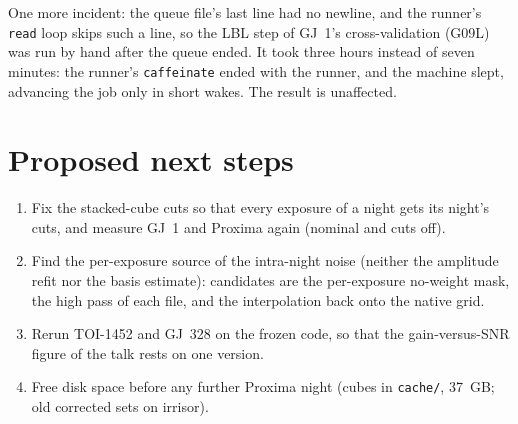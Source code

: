 \noindent One more incident: the queue file's last line had no newline, and
the runner's \texttt{read} loop skips such a line, so the LBL step of GJ~1's
cross-validation (G09L) was run by hand after the queue ended. It took three
hours instead of seven minutes: the runner's \texttt{caffeinate} ended with
the runner, and the machine slept, advancing the job only in short wakes. The
result is unaffected.

\section*{Proposed next steps}

\begin{enumerate}
\item Fix the stacked-cube cuts so that every exposure of a night gets its
  night's cuts, and measure GJ~1 and Proxima again (nominal and cuts off).
\item Find the per-exposure source of the intra-night noise (neither the
  amplitude refit nor the basis estimate): candidates are the per-exposure
  no-weight mask, the high pass of each file, and the interpolation back onto
  the native grid.
\item Rerun TOI-1452 and GJ~328 on the frozen code, so that the
  gain-versus-SNR figure of the talk rests on one version.
\item Free disk space before any further Proxima night (cubes in
  \texttt{cache/}, 37~GB; old corrected sets on irrisor).
\end{enumerate}
